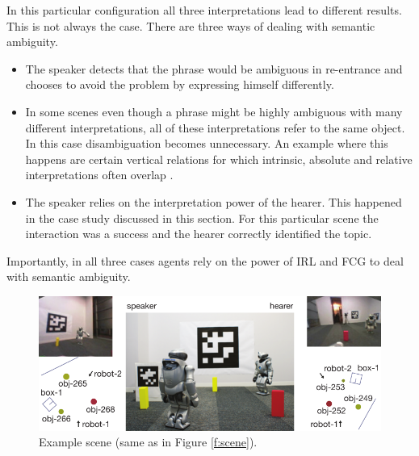 In this particular configuration all three interpretations lead 
to different results. This is not always the case. There are three 
ways of dealing with semantic ambiguity.
\begin{itemize}
\item The speaker detects that the phrase would be ambiguous in re-entrance and 
chooses to avoid the problem by expressing himself differently.
\item  In some scenes even though a phrase might be highly ambiguous with 
many different interpretations, all of these interpretations refer to the same object.
In this case disambiguation becomes unnecessary. An example where this happens
are certain vertical relations for which intrinsic, absolute and 
relative interpretations often overlap
\citep{carlson1999selecting}.
\item The speaker relies on the interpretation power of the hearer. This happened in
the case study discussed in this section. For this particular scene the interaction was
a success and the hearer correctly identified the topic.
\end{itemize}
Importantly, in all three cases agents rely on the power of IRL and FCG 
to deal with semantic ambiguity. 


\begin{figure}
\begin{center}
\includegraphics[width=0.9\columnwidth]{figs/space-scene-2-small}
\end{center}
\caption[Example scene]{Example scene (same as in Figure \ref{f:scene}).}
\label{f:scene-repeated}
\end{figure}

